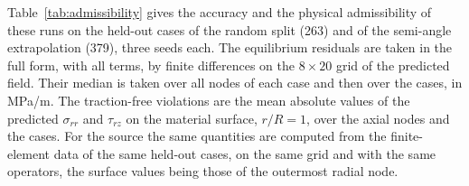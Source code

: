 Table~\ref{tab:admissibility} gives the accuracy and the physical admissibility of these runs on the held-out cases of the random split (263) and of the semi-angle extrapolation (379), three seeds each. The equilibrium residuals are taken in the full form, with all terms, by finite differences on the $8\times20$ grid of the predicted field. Their median is taken over all nodes of each case and then over the cases, in MPa/m. The traction-free violations are the mean absolute values of the predicted $\sigma_{rr}$ and $\tau_{rz}$ on the material surface, $r/R=1$, over the axial nodes and the cases. For the source the same quantities are computed from the finite-element data of the same held-out cases, on the same grid and with the same operators, the surface values being those of the outermost radial node. %
